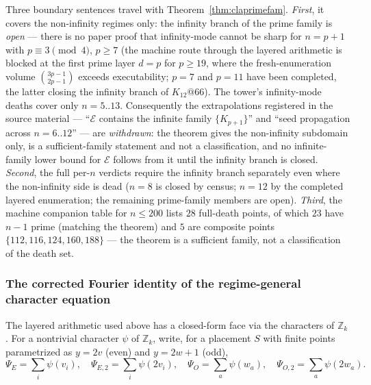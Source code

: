 \begin{remark}\label{rem:claprimscope}
Three boundary sentences travel with Theorem~\ref{thm:claprimefam}.
\emph{First}, it covers the non-infinity regimes only: the infinity
branch of the prime family is \emph{open} --- there is no paper proof that
infinity-mode cannot be sharp for $n=p+1$ with $p\equiv3\pmod4$, $p\ge7$
(the machine route through the layered arithmetic is blocked at the first
prime layer $d=p$ for $p\ge19$, where the fresh-enumeration volume
$\binom{3p-1}{2p-1}$ exceeds executability; $p=7$ and $p=11$ have been
completed, the latter closing the infinity branch of $K_{12}@66$). The
tower's infinity-mode deaths cover only $n=5..13$. Consequently the
extrapolations registered in the source material --- ``$\mathcal{E}$
contains the infinite family $\{K_{p+1}\}$'' and ``seed propagation
across $n=6..12$'' --- are \emph{withdrawn}: the theorem gives the
non-infinity subdomain only, is a sufficient-family statement and not a
classification, and no infinite-family lower bound for $\mathcal{E}$
follows from it until the infinity branch is closed. \emph{Second}, the
full per-$n$ verdicts require the infinity branch separately even where
the non-infinity side is dead ($n=8$ is closed by census; $n=12$ by the
completed layered enumeration; the remaining prime-family members are
open). \emph{Third}, the machine companion table for $n\le200$ lists $28$
full-death points, of which $23$ have $n-1$ prime (matching the theorem)
and $5$ are composite points $\{112,116,124,160,188\}$ --- the theorem is
a sufficient family, not a classification of the death set.
\end{remark}

\subsubsection{The corrected Fourier identity of the regime-general
character equation}\label{subsubsec:fourier}

The layered arithmetic used above has a closed-form face via the
characters of $\mathbb{Z}_k$. For a nontrivial character $\psi$ of
$\mathbb{Z}_k$, write, for a placement $S$ with finite points parametrized
as $y=2v$ (even) and $y=2w+1$ (odd),
\[
\Psi_E=\textstyle\sum_i \psi(v_i),\quad
\Psi_{E,2}=\textstyle\sum_i \psi(2v_i),\quad
\Psi_O=\textstyle\sum_a \psi(w_a),\quad
\Psi_{O,2}=\textstyle\sum_a \psi(2w_a).
\]

